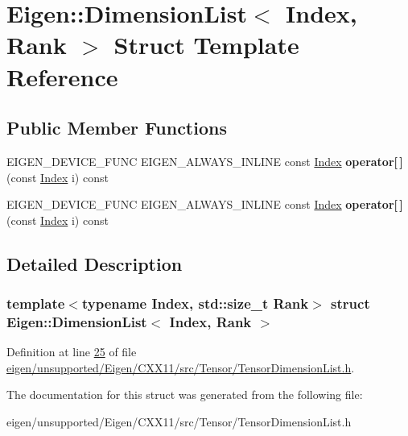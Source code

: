 \hypertarget{struct_eigen_1_1_dimension_list}{}\section{Eigen\+:\+:Dimension\+List$<$ Index, Rank $>$ Struct Template Reference}
\label{struct_eigen_1_1_dimension_list}
\subsection*{Public Member Functions}
\begin{DoxyCompactItemize}
\item 
\mbox{\label{struct_eigen_1_1_dimension_list_a1a696c689cedcc0529e3c91c47c0607c}} 
E\+I\+G\+E\+N\+\_\+\+D\+E\+V\+I\+C\+E\+\_\+\+F\+U\+NC E\+I\+G\+E\+N\+\_\+\+A\+L\+W\+A\+Y\+S\+\_\+\+I\+N\+L\+I\+NE const \hyperlink{namespace_eigen_a62e77e0933482dafde8fe197d9a2cfde}{Index} {\bfseries operator\mbox{[}$\,$\mbox{]}} (const \hyperlink{namespace_eigen_a62e77e0933482dafde8fe197d9a2cfde}{Index} i) const
\item 
\mbox{\label{struct_eigen_1_1_dimension_list_a1a696c689cedcc0529e3c91c47c0607c}} 
E\+I\+G\+E\+N\+\_\+\+D\+E\+V\+I\+C\+E\+\_\+\+F\+U\+NC E\+I\+G\+E\+N\+\_\+\+A\+L\+W\+A\+Y\+S\+\_\+\+I\+N\+L\+I\+NE const \hyperlink{namespace_eigen_a62e77e0933482dafde8fe197d9a2cfde}{Index} {\bfseries operator\mbox{[}$\,$\mbox{]}} (const \hyperlink{namespace_eigen_a62e77e0933482dafde8fe197d9a2cfde}{Index} i) const
\end{DoxyCompactItemize}


\subsection{Detailed Description}
\subsubsection*{template$<$typename Index, std\+::size\+\_\+t Rank$>$\newline
struct Eigen\+::\+Dimension\+List$<$ Index, Rank $>$}



Definition at line \hyperlink{eigen_2unsupported_2_eigen_2_c_x_x11_2src_2_tensor_2_tensor_dimension_list_8h_source_l00025}{25} of file \hyperlink{eigen_2unsupported_2_eigen_2_c_x_x11_2src_2_tensor_2_tensor_dimension_list_8h_source}{eigen/unsupported/\+Eigen/\+C\+X\+X11/src/\+Tensor/\+Tensor\+Dimension\+List.\+h}.



The documentation for this struct was generated from the following file\+:\begin{DoxyCompactItemize}
\item 
eigen/unsupported/\+Eigen/\+C\+X\+X11/src/\+Tensor/\+Tensor\+Dimension\+List.\+h\end{DoxyCompactItemize}
